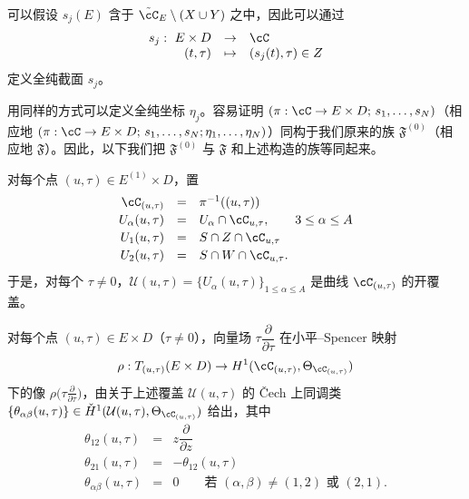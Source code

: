 
可以假设 $s_j(E)$ 含于 $\tilde{\cC}_E\setminus(X\cup Y)$ 之中，因此可以通过
\[
\begin{array}{rcl}
s_j:\ E\times D & \to & \cC\\
(t,\tau) & \mapsto & (s_j(t),\tau)\in Z
\end{array}
\]
定义全纯截面 $s_j$。

用同样的方式可以定义全纯坐标 $\eta_j$。容易证明 $(\pi:\cC\to E\times D;\,s_1,\dots,s_N)$（相应地 $(\pi:\cC\to E\times D;\,s_1,\dots,s_N;\eta_1,\dots,\eta_N)$）同构于我们原来的族 $\mathfrak{F}^{(0)}$（相应地 $\mathfrak{F}$）。因此，以下我们把 $\mathfrak{F}^{(0)}$ 与 $\mathfrak{F}$ 和上述构造的族等同起来。

对每个点 $(u,\tau)\in E^{(1)}\times D$，置
\[
\begin{array}{rcl}
\cC_{(u,\tau)} & = & \pi^{-1}((u,\tau))\\[2pt]
U_\alpha(u,\tau) & = & U_\alpha\cap\cC_{u,\tau},\qquad 3\le\alpha\le A\\[2pt]
U_1(u,\tau) & = & S\cap Z\cap\cC_{u,\tau}\\[2pt]
U_2(u,\tau) & = & S\cap W\cap\cC_{u,\tau}.
\end{array}
\]
于是，对每个 $\tau\ne0$，$\mathcal U(u,\tau)=\{U_\alpha(u,\tau)\}_{1\le\alpha\le A}$ 是曲线 $\cC_{(u,\tau)}$ 的开覆盖。

\begin{lemma}[5.16]
对每个点 $(u,\tau)\in E\times D$（$\tau\ne0$），向量场 $\tau\dfrac{\partial}{\partial\tau}$ 在小平–Spencer 映射
\[
\rho: T_{(u,\tau)}(E\times D)\to H^1(\cC_{(u,\tau)},\Theta_{\cC_{(u,\tau)}})
\]
下的像 $\rho\bigl(\tau\frac{\partial}{\partial\tau}\bigr)$，由关于上述覆盖 $\mathcal U(u,\tau)$ 的 Čech 上同调类 $\{\theta_{\alpha\beta}(u,\tau)\}\in\check H^1(\mathcal U(u,\tau),\Theta_{\cC_{(u,\tau)}})$ 给出，其中
\[
\begin{array}{rcl}
\theta_{12}(u,\tau) & = & z\dfrac{\partial}{\partial z}\\[6pt]
\theta_{21}(u,\tau) & = & -\theta_{12}(u,\tau)\\[6pt]
\theta_{\alpha\beta}(u,\tau) & = & 0\qquad\text{若 } (\alpha,\beta)\ne(1,2)\text{ 或 }(2,1).
\end{array}
\]
\end{lemma}

